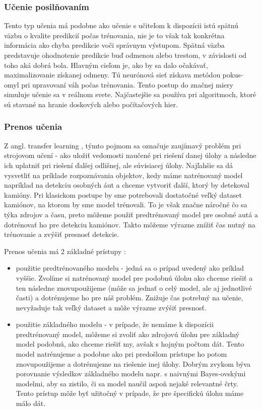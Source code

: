 \subsubsection{Učenie posilňovaním}
Tento typ učenia má podobne ako učenie s učiteľom k dispozícii istú spätnú väzbu o kvalite predikcií počas trénovania, nie je to však tak konkrétna informácia ako chyba predikcie voči správnym výstupom. Spätná väzba predstavuje ohodnotenie predikcie buď odmenou alebo trestom, v závislosti od toho aká dobrá bola. Hlavným cieľom je, ako by sa dalo očakávať, maximalizovanie získanej odmeny. Tú neurónová sieť získava metódou pokus- omyl pri upravovaní váh počas trénovania. Tento postup do značnej miery simuluje učenie sa v reálnom svete. Najčastejšie sa používa pri algoritmoch, ktoré sú stavané na hranie doskových alebo počítačových hier. 


\subsubsection{Prenos učenia}
\label{transfer_learning}
Z angl. transfer learning \cite{transfer_learning}, týmto pojmom sa označuje zaujímavý problém pri strojovom učení - ako uložiť vedomosti naučené pri riešení danej úlohy a následne ich uplatniť pri riešení ďalšej odlišnej, ale súvisiacej úlohy. Najľahšie sa dá vysvetliť na príklade rozpoznávania objektov, kedy máme natrénovaný model napríklad na detekciu osobných áut a chceme vytvoriť ďalší, ktorý by detekoval  kamióny. Pri klasickom postupe by sme potrebovali dostatočné veľký dataset kamiónov, na ktorom by sme model trénovali. To je však značne náročné čo sa týka zdrojov a času, preto môžeme použiť predtrénovaný model pre osobné autá a dotrénovať ho pre detekciu kamiónov. Takto môžeme výrazne znížiť čas nutný na trénovanie a zvýšiť presnosť detekcie. 

Prenos učenia má 2 základné prístupy \cite{transfer_learning_approaches}:
\begin{itemize}
	\item použitie predtrénovaného modelu - jedná sa o prípad uvedený ako príklad vyššie. Zvolíme si natrénovaný model pre podobnú úlohu ako chceme riešiť a ten následne znovupoužijeme (môže sa jednať o celý model, ale aj jednotlivé časti) a dotrénujeme ho pre náš problém. Znižuje čas potrebný na učenie, nevyžaduje tak veľký dataset a môže výrazne zvýšiť presnosť. 
	\item použitie základného modelu - v prípade, že nemáme k dispozícii predtrénovaný model, môžeme si zvoliť ako zdrojovú úlohu pre základný model podobnú, ako chceme riešiť my, avšak s hojným počtom dát. Tento model natrénujeme a podobne ako pri predošlom prístupe ho potom znovupoužijeme a dotrénujeme na riešenie inej úlohy. Dobrým zvykom býva porovnanie výsledkov základného modelu napr. s naivnými Bayes-ovskými modelmi, aby sa zistilo, či sa model naučil aspoň nejaké relevantné črty. Tento prístup môže byť užitočný v prípade, že pre špecifickú úlohu máme málo dát. 
\end{itemize}


